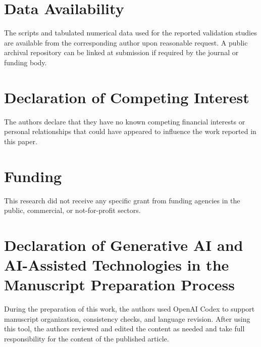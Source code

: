 \documentclass[11pt]{article}
\begin{document}
\section*{Data Availability}

The scripts and tabulated numerical data used for the reported validation studies are available from the corresponding author upon reasonable request. A public archival repository can be linked at submission if required by the journal or funding body.

\section*{Declaration of Competing Interest}

The authors declare that they have no known competing financial interests or personal relationships that could have appeared to influence the work reported in this paper.

\section*{Funding}

This research did not receive any specific grant from funding agencies in the public, commercial, or not-for-profit sectors.

\section*{Declaration of Generative AI and AI-Assisted Technologies in the Manuscript Preparation Process}

During the preparation of this work, the authors used OpenAI Codex to support manuscript organization, consistency checks, and language revision. After using this tool, the authors reviewed and edited the content as needed and take full responsibility for the content of the published article.



\end{document}
